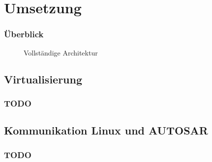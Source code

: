 \documentclass[]{beamer}
\newcommand{\inputImage}[1]{}
\begin{document}







\section{Umsetzung}
\label{sec:umsetzung}

\begin{frame}
\frametitle{Überblick}
    \begin{figure}[ht]
        \centering
        \resizebox{0.8\linewidth}{!}{\inputImage{arch_finished.dia}}
        \caption{Vollständige Architektur}
        \label{fig:arch_finished}
    \end{figure}
\end{frame}




\subsection{Virtualisierung}
\begin{frame}
\frametitle{TODO}

\end{frame}




\subsection{Kommunikation Linux und AUTOSAR}
\begin{frame}
\frametitle{TODO}

\end{frame}
\end{document}
